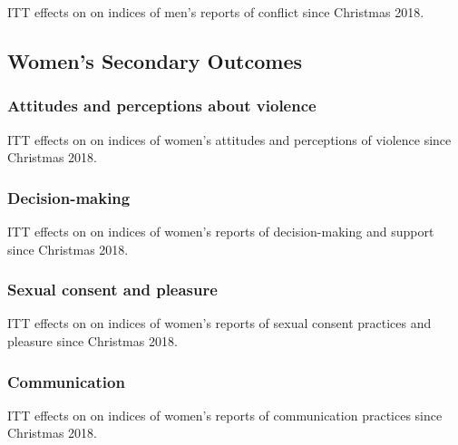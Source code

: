 \documentclass[11pt,english]{article}
\begin{document}
\begin{table}[H]
\centering

\caption{ITT effects on on indices of men's reports of conflict since Christmas 2018.}
\label{tab:conflict_results_m}
\end{table}

\subsection{Women's Secondary Outcomes}


\subsubsection{Attitudes and perceptions about violence}

\begin{table}[H]
\centering

\caption{ITT effects on on indices of women's attitudes and perceptions of violence since Christmas 2018.}
\label{tab:attitudes_results_w}
\end{table}

\subsubsection{Decision-making}

\begin{table}[H]
\centering

\caption{ITT effects on on indices of women's reports of decision-making and support since Christmas 2018.}
\label{tab:dm_etc_results_w}
\end{table}

\subsubsection{Sexual consent and pleasure}

\begin{table}[H]
\centering

\caption{ITT effects on on indices of women's reports of sexual consent practices and pleasure since Christmas 2018.}
\label{tab:sex_results_w}
\end{table}

\subsubsection{Communication}

\begin{table}[H]
\centering

\caption{ITT effects on on indices of women's reports of communication practices since Christmas 2018.}
\label{tab:comm_results_w}
\end{table}
\end{document}
